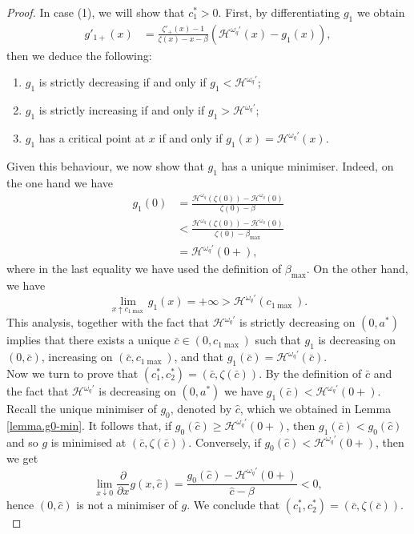 \documentclass[10pt,a4paper]{amsart}
\newcommand{\cH}{\mathcal{H}}
\newcommand{\homega}{\omega_q}
\renewcommand{\geq}{\geqslant}
\begin{document}
\begin{proof}
	In case (1), we will show that $c_1^\ast > 0$. First, by differentiating $g_1$ we obtain
		\begin{align*}
		g'_{1+}(x)&=\frac{\zeta'_+(x)-1}{\zeta(x)-x-\beta}(\cH^{\homega\prime}(x) - g_1(x)),
		\end{align*}
		then we deduce the following:
			\begin{enumerate}
					\item $g_1$ is strictly decreasing if and only if $ g_1 < \cH^{\homega\prime}$;
					\item $g_1$ is strictly increasing if and only if $ g_1 > \cH^{\homega\prime}$;
					\item $g_1$ has a critical point at $x$ if and only if $ g_1(x) = \cH^{\homega\prime}(x)$.
				\end{enumerate}
	Given this behaviour, we now show that $g_1$ has a unique minimiser. Indeed, on the one hand we have
	\begin{align*}
		g_1(0) &= \frac{\cH^{\homega}(\zeta(0)) - \cH^{\homega}(0)}{\zeta(0)-\beta}\\
		& < \frac{\cH^{\homega}(\zeta(0)) - \cH^{\homega}(0)}{\zeta(0)-\beta_{\max}}\\
		&= \cH^{\homega\prime}(0+),
	\end{align*}
	where in the last equality we have used the definition of $\beta_{\max}$. On the other hand, we have
	\[
	\lim_{x \uparrow c_{1\max}}g_1(x) = +\infty > \cH^{\homega\prime}(c_{1\max}).
	\]
	This analysis, together with the fact that $\cH^{\homega\prime}$ is strictly decreasing on $(0,a^\ast)$ implies that there exists a unique $\bar{c} \in (0,c_{1\max})$ such that $g_1$ is decreasing on $(0,\bar{c})$, increasing on $(\bar{c},c_{1\max})$, and that $g_1(\bar{c})= \cH^{\homega\prime}(\bar{c})$.\\
	Now we turn to prove that $(c_1^\ast,c_2^\ast) = (\bar{c},\zeta(\bar{c}))$. By the definition of $\bar{c}$ and the fact that $\cH^{\homega\prime}$ is decreasing on $(0,a^\ast)$ we have $g_1(\bar{c})< \cH^{\homega\prime}(0+)$. Recall the unique minimiser of $g_0$, denoted by $\hat{c}$, which we obtained in Lemma \ref{lemma.g0-min}. It follows that, if $g_0(\hat{c})\geq \cH^{\homega\prime}(0+)$, then $g_1(\bar{c}) < g_0(\hat{c})$ and so $g$ is minimised at $(\bar{c},\zeta(\bar{c}))$. Conversely, if $g_0(\hat{c}) < \cH^{\homega\prime}(0+)$, then we get
	\[
	\lim_{x\downarrow 0}\frac{\partial}{\partial x} g(x,\hat{c}) = \frac{g_0(\hat{c}) - \cH^{\homega\prime}(0+)}{\hat{c}-\beta} < 0,
	\]
	hence $(0,\hat{c})$ is not a minimiser of $g$. We conclude that $(c_1^\ast,c_2^\ast) = (\bar{c},\zeta(\bar{c}))$.\\

\end{proof}
\end{document}
